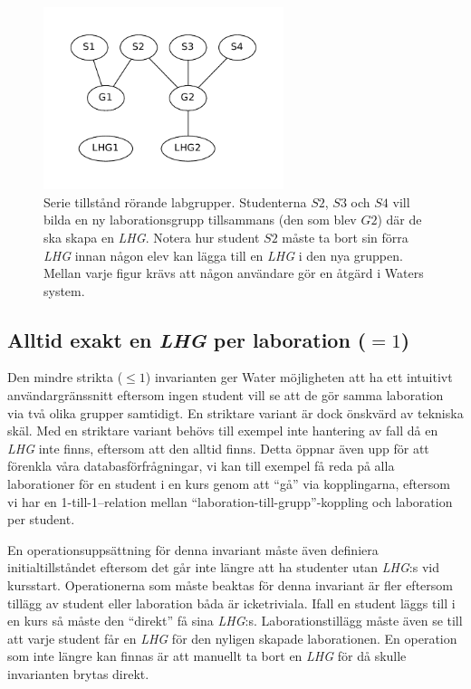 \begin{figure}
  \includegraphics[width=7.0cm]{fig/labgroup/slack_add_5.pdf}        
  \caption[Serie tillstånd rörande labgrupper.]
  {Serie tillstånd rörande labgrupper. Studenterna $S2$, $S3$ och $S4$ vill
  bilda en ny laborationsgrupp tillsammans (den som blev $G2$) där de ska skapa
  en \emph{LHG}. Notera hur student $S2$ måste ta bort sin förra \emph{LHG} innan någon elev
  kan lägga till en \emph{LHG} i den nya gruppen. Mellan varje figur krävs att någon
  användare gör en åtgärd i Waters system.}
  \label{fig:slack_series}
  
\end{figure}

\subsection{Alltid exakt en \emph{LHG} per laboration ($= 1$)}
Den mindre strikta ($\leq 1$) invarianten ger Water möjligheten att ha ett intuitivt användargränssnitt eftersom ingen student vill se att de gör samma laboration via två olika grupper samtidigt. En striktare variant är dock önskvärd av tekniska skäl. Med en striktare variant behövs till exempel inte hantering av fall då en \emph{LHG} inte finns, eftersom att den alltid finns. Detta öppnar även upp för att förenkla våra databasförfrågningar, vi kan till exempel få reda på alla laborationer för en student i en kurs genom att “gå” via kopplingarna, eftersom vi har en 1-till-1–relation mellan “laboration-till-grupp”-koppling och laboration per student.

En operationsuppsättning för denna invariant måste även definiera initialtillståndet eftersom det går inte längre att ha studenter utan \emph{LHG}:s vid kursstart. Operationerna som måste beaktas för denna invariant är fler eftersom tillägg av student eller laboration båda är icketriviala. Ifall en student läggs till i en kurs så måste den “direkt” få sina \emph{LHG}:s. Laborationstillägg måste även se till att varje student får en \emph{LHG} för den nyligen skapade laborationen. En operation som inte längre kan finnas är att manuellt ta bort en \emph{LHG} för då skulle invarianten brytas direkt.


